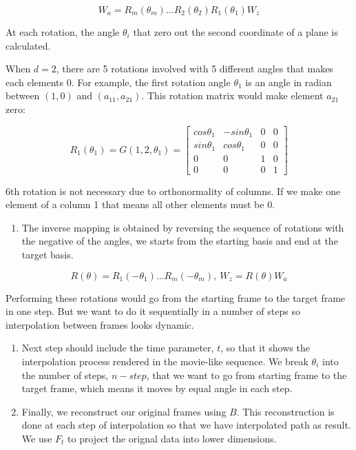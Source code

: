 \[ W_a = R_m(\theta_m) ... R_2(\theta_2)R_1(\theta_1)W_z\]

At each rotation, the angle \(\theta_i\) that zero out the second coordinate of a plane is calculated.

When \(d = 2\), there are 5 rotations involved with 5 different angles that makes each elements 0. For example, the first rotation angle \(\theta_1\) is an angle in radian between \((1, 0)\) and \((a_{11}, a_{21})\). This rotation matrix would make element \(a_{21}\) zero:

\[R_1(\theta_1) = G(1, 2, \theta_1) = \begin{bmatrix} cos\theta_1 & -sin\theta_1 & 0 & 0 \\sin\theta_1  &cos\theta_1 & 0 &0 \\ 0&0&1&0 \\0&0&0&1\end{bmatrix}\]

6th rotation is not necessary due to orthonormality of columns. If we make one element of a column 1 that means all other elements must be 0.

\begin{enumerate}
\def\labelenumi{\arabic{enumi}.}
\setcounter{enumi}{3}
\tightlist
\item
  The inverse mapping is obtained by reversing the sequence of rotations with the negative of the angles, we starts from the starting basis and end at the target basis.
\end{enumerate}

\[R(\theta) = R_1(-\theta_1) ... R_m(-\theta_m), \    W_z = R(\theta)W_a\]

Performing these rotations would go from the starting frame to the target frame in one step. But we want to do it sequentially in a number of steps so interpolation between frames looks dynamic.

\begin{enumerate}
\def\labelenumi{\arabic{enumi}.}
\setcounter{enumi}{4}
\item
  Next step should include the time parameter, \(t\), so that it shows the interpolation process rendered in the movie-like sequence. We break \(\theta_i\) into the number of steps, \(n-step\), that we want to go from starting frame to the target frame, which means it moves by equal angle in each step.
\item
  Finally, we reconstruct our original frames using \(B\). This reconstruction is done at each step of interpolation so that we have interpolated path as result. We use \(F_t\) to project the orignal data into lower dimensions.
\end{enumerate}

